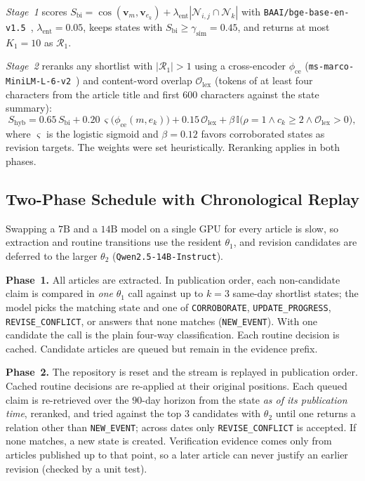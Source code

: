 \documentclass[journal]{IEEEtran}
\begin{document}
\emph{Stage~1} scores $S_{\text{bi}}=\cos(\mathbf{v}_m,\mathbf{v}_{e_k})+\lambda_{\text{ent}}|\mathcal{N}_{i,j}\cap\mathcal{N}_k|$ with \texttt{BAAI/bge-base-en-v1.5}~\cite{xiao2024cpack}, $\lambda_{\text{ent}}=0.05$, keeps states with $S_{\text{bi}}\ge\gamma_{\text{sim}}=0.45$, and returns at most $K_1=10$ as $\mathcal{R}_1$.

\emph{Stage~2} reranks any shortlist with $|\mathcal{R}_1|>1$ using a cross-encoder $\phi_{\text{ce}}$ (\texttt{ms-marco-MiniLM-L-6-v2}~\cite{wang2020minilm, nguyen2016msmarco}) and content-word overlap $\mathcal{O}_{\text{lex}}$ (tokens of at least four characters from the article title and first $600$ characters against the state summary):
\begin{equation}
S_{\text{hyb}} = 0.65\,S_{\text{bi}} + 0.20\,\varsigma\big(\phi_{\text{ce}}(m,e_k)\big) + 0.15\,\mathcal{O}_{\text{lex}} + \beta\,\mathbb{I}\big(\rho{=}1 \land c_k{\ge}2 \land \mathcal{O}_{\text{lex}}{>}0\big),
\label{eq:hybrid_rerank}
\end{equation}
where $\varsigma$ is the logistic sigmoid and $\beta=0.12$ favors corroborated states as revision targets. The weights were set heuristically. Reranking applies in both phases.

\subsection{Two-Phase Schedule with Chronological Replay}
\label{subsec:schedule}

Swapping a $7\text{B}$ and a $14\text{B}$ model on a single GPU for every article is slow, so extraction and routine transitions use the resident $\theta_1$, and revision candidates are deferred to the larger $\theta_2$ (\texttt{Qwen2.5-14B-Instruct}).

\textbf{Phase~1.} All articles are extracted. In publication order, each non-candidate claim is compared in \emph{one} $\theta_1$ call against up to $k=3$ same-day shortlist states; the model picks the matching state and one of \texttt{CORROBORATE}, \texttt{UPDATE\_PROGRESS}, \texttt{REVISE\_CONFLICT}, or answers that none matches (\texttt{NEW\_EVENT}). With one candidate the call is the plain four-way classification. Each routine decision is cached. Candidate articles are queued but remain in the evidence prefix.

\textbf{Phase~2.} The repository is reset and the stream is replayed in publication order. Cached routine decisions are re-applied at their original positions. Each queued claim is re-retrieved over the $90$-day horizon from the state \emph{as of its publication time}, reranked, and tried against the top $3$ candidates with $\theta_2$ until one returns a relation other than \texttt{NEW\_EVENT}; across dates only \texttt{REVISE\_CONFLICT} is accepted. If none matches, a new state is created. Verification evidence comes only from articles published up to that point, so a later article can never justify an earlier revision (checked by a unit test).
\end{document}
